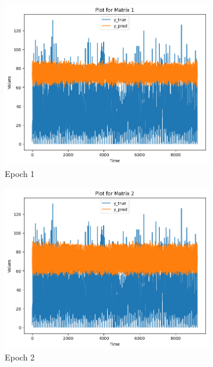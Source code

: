 \documentclass[a4paper, article, oneside, USenglish, IN5460]{memoir}
\begin{document}
\begin{figure}
        \centering
        \begin{subfigure}[b]{0.475\textwidth}
            \centering
            \includegraphics[width=\textwidth]{figures/RNN-pred/rnn1.png}
            {{\small Epoch 1}}    
        \end{subfigure}
        \hfill
        \begin{subfigure}[b]{0.475\textwidth}  
            \centering 
            \includegraphics[width=\textwidth]{figures/RNN-pred/rnn2.png}
            {{\small Epoch 2}}    
        \end{subfigure}

\end{figure}
\end{document}

